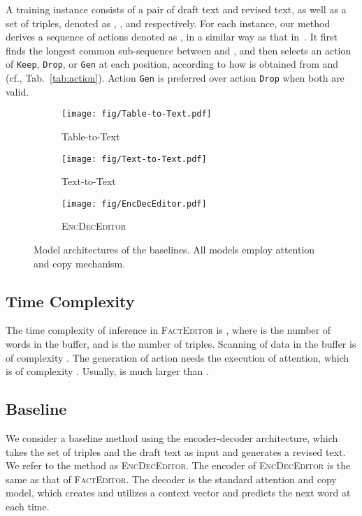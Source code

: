 \documentclass[11pt,a4paper]{article}
\begin{document}
A training instance consists of a pair of draft text and revised text, as well as a set of triples, denoted as , , and   respectively. For each instance, our method derives a sequence of actions denoted as , in a similar way as that in~\cite{dong2019editnts}. It first finds the longest common sub-sequence between  and , and then selects an action of \texttt{Keep}, \texttt{Drop}, or \texttt{Gen} at each position, according to how  is obtained from  and  (cf., Tab.~\ref{tab:action}). Action \texttt{Gen} is preferred over action \texttt{Drop} when both are valid.
\begin{figure*}
    \centering
    \begin{subfigure}[b]{0.3\linewidth}
        \centering
        \texttt{[image: fig/Table-to-Text.pdf]}
        \caption{Table-to-Text}
        \label{fig:d2t}
    \end{subfigure}
    \hfill
    \begin{subfigure}[b]{0.3\linewidth}
        \centering
        \texttt{[image: fig/Text-to-Text.pdf]}
        \caption{Text-to-Text}
        \label{fig:t2t}
    \end{subfigure}
    \hfill
    \begin{subfigure}[b]{0.35\linewidth}
        \centering
        \texttt{[image: fig/EncDecEditor.pdf]}
        \caption{\textsc{EncDecEditor}}
        \label{fig:encdec}
    \end{subfigure}
    \caption{Model architectures of the baselines. All models employ attention and copy mechanism.}
    \label{fig:baselines}
\end{figure*}

\subsection{Time Complexity}
\label{sec:runtime}

The time complexity of inference in \textsc{FactEditor} is , where  is the number of words in the buffer, and  is the number of triples. Scanning of data in the buffer is of complexity . The generation of action needs the execution of attention, which is of complexity . Usually,  is much larger than . 

\subsection{Baseline}

We consider a baseline method using the encoder-decoder architecture, which takes the set of triples and the draft text as input and generates a revised text. We refer to the method as \textsc{EncDecEditor}. The encoder of \textsc{EncDecEditor} is the same as that of \textsc{FactEditor}.  The decoder is the standard attention and copy model, which creates and utilizes a context vector and predicts the next word at each time.
\end{document}
